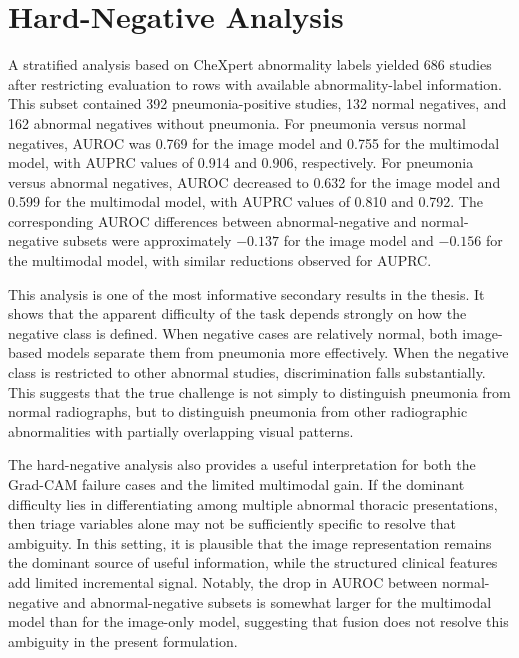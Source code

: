 \section{Hard-Negative Analysis}

A stratified analysis based on CheXpert abnormality labels yielded 686 studies after restricting evaluation to rows with available abnormality-label information. This subset contained 392 pneumonia-positive studies, 132 normal negatives, and 162 abnormal negatives without pneumonia. For pneumonia versus normal negatives, AUROC was 0.769 for the image model and 0.755 for the multimodal model, with AUPRC values of 0.914 and 0.906, respectively. For pneumonia versus abnormal negatives, AUROC decreased to 0.632 for the image model and 0.599 for the multimodal model, with AUPRC values of 0.810 and 0.792. The corresponding AUROC differences between abnormal-negative and normal-negative subsets were approximately $-0.137$ for the image model and $-0.156$ for the multimodal model, with similar reductions observed for AUPRC.

This analysis is one of the most informative secondary results in the thesis. It shows that the apparent difficulty of the task depends strongly on how the negative class is defined. When negative cases are relatively normal, both image-based models separate them from pneumonia more effectively. When the negative class is restricted to other abnormal studies, discrimination falls substantially. This suggests that the true challenge is not simply to distinguish pneumonia from normal radiographs, but to distinguish pneumonia from other radiographic abnormalities with partially overlapping visual patterns.

The hard-negative analysis also provides a useful interpretation for both the Grad-CAM failure cases and the limited multimodal gain. If the dominant difficulty lies in differentiating among multiple abnormal thoracic presentations, then triage variables alone may not be sufficiently specific to resolve that ambiguity. In this setting, it is plausible that the image representation remains the dominant source of useful information, while the structured clinical features add limited incremental signal. Notably, the drop in AUROC between normal-negative and abnormal-negative subsets is somewhat larger for the multimodal model than for the image-only model, suggesting that fusion does not resolve this ambiguity in the present formulation.